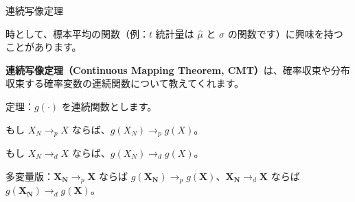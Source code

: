 \documentclass[11pt,handout]{beamer}
\newenvironment{wideitemize}{\itemize\addtolength{\itemsep}{10pt}}{\enditemize}
\begin{document}
\begin{frame}{連続写像定理}

\begin{wideitemize}	

\item
時として、標本平均の関数（例：$t$ 統計量は $\hat\mu$ と $\sigma$ の関数です）に興味を持つことがあります。

\pause
\item
\textbf{連続写像定理（Continuous Mapping Theorem, CMT）}は、確率収束や分布収束する確率変数の連続関数について教えてくれます。

\pause
\item
定理：$g(\cdot)$ を連続関数とします。\\
\vspace{.2cm}

もし $X_N \rightarrow_p X$ ならば、$g(X_N) \rightarrow_p g(X)$。 \\
\vspace{.2cm}
\pause

もし $X_N \rightarrow_d X$ ならば、$g(X_N) \rightarrow_d g(X)$。\\
\vspace{0.2cm}
\pause{}

多変量版：$\mathbf{X_N} \rightarrow_p \mathbf{X}$ ならば $g(\mathbf{X_N}) \rightarrow_p g(\mathbf{X})$、$\mathbf{X_N} \rightarrow_d \mathbf{X}$ ならば $g(\mathbf{X_N}) \rightarrow_d g(\mathbf{X})$。

\end{wideitemize}

\end{frame}
\end{document}
